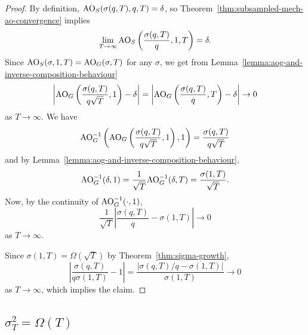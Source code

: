 \documentclass{article}
\theoremstyle{plain}
\theoremstyle{definition}
\theoremstyle{remark}
\begin{document}
\begin{proof}
    By definition, $\mathrm{AO}_S(\sigma(q, T), q, T) = \delta$, so 
    Theorem~\ref{thm:subsampled-mech-ao-convergence} implies
    \begin{equation}
        \lim_{T\to \infty} \mathrm{AO}_S\left(\frac{\sigma(q, T)}{q}, 1, T\right) = \delta.
        \label{eq:ao-full-batch-limit}
    \end{equation}
    Since $\mathrm{AO}_S(\sigma, 1, T) = \mathrm{AO}_G(\sigma, T)$ for any $\sigma$,
    we get from Lemma~\ref{lemma:aog-and-inverse-composition-behaviour}
    \begin{equation}
        \left|\mathrm{AO}_G\left(\frac{\sigma(q, T)}{q\sqrt{T}}, 1\right) - \delta\right|
        = \left|\mathrm{AO}_G\left(\frac{\sigma(q, T)}{q}, T\right) - \delta\right|
        \to 0
    \end{equation}
    as $T \to \infty$. 
    We have
    \begin{equation}
        \mathrm{AO}_G^{-1}\left(\mathrm{AO}_G\left(\frac{\sigma(q, T)}{q\sqrt{T}}, 1\right), 1\right)
        = \frac{\sigma(q, T)}{q\sqrt{T}}
    \end{equation}
    and by Lemma~\ref{lemma:aog-and-inverse-composition-behaviour},
    \begin{equation}
        \mathrm{AO}_G^{-1}(\delta, 1) = \frac{1}{\sqrt{T}}\mathrm{AO}_G^{-1}(\delta, T) = \frac{\sigma(1, T)}{\sqrt{T}}.
    \end{equation}
    Now, by the continuity of $\mathrm{AO}_G^{-1}(\cdot, 1)$,
    \begin{equation}
        \frac{1}{\sqrt{T}}\left|\frac{\sigma(q, T)}{q} - \sigma(1, T)\right| \to 0
    \end{equation}
    as $T\to \infty$.

    Since $\sigma(1, T) = \Omega(\sqrt{T})$ by Theorem~\ref{thm:sigma-growth},
    \begin{equation}
        \left|\frac{\sigma(q, T)}{q\sigma(1, T)} - 1\right|
        = \frac{|\sigma(q, T)/q - \sigma(1, T)|}{\sigma(1, T)}
        \to 0
    \end{equation}
    as $T\to \infty$, which implies the claim.
\end{proof}

\subsection{$\sigma_T^2 = \Omega(T)$}\label{app:sigma-growth}
\end{document}
